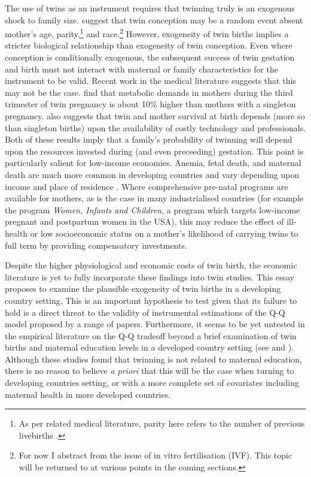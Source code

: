 \documentclass{article}[11pt,subeqn]
\begin{document}
\begin{spacing}{1.5}
The use of twins as an instrument requires that twinning truly is an exogenous shock to family size.  \citet{Kahnetal2003} suggest that twin conception may be a random event absent mother's age, 
parity,\footnote{As per related medical literature, parity here refers to the number of previous livebirths \citep{Elwood1978}.} and race.\footnote{For now I abstract from 
the issue of in vitro fertilisation (IVF).  This topic will be returned to at various points in the coming sections.} However, exogeneity of twin births implies a stricter 
biological relationship than exogeneity of twin conception.  Even where conception is conditionally exogenous, the subsequent success of twin gestation and birth must not interact with maternal or family characteristics for the instrument to be valid.  Recent work in the medical literature 
suggests that this may not be the case. \citet{Shinagawaetal2005} find that metabolic demands in mothers during the third trimester of twin pregnancy is about 10\% higher 
than mothers with a singleton pregnancy. \citet{Philipson2008}  also suggests that twin and mother survival at birth depends (more so than singleton births) upon the availability 
of costly technology and professionals.  Both of these results imply that a family's probability of twinning will depend upon the resources invested during (and even preceeding) 
gestation.  This point is particularly salient for low-income economies.  Anemia, fetal death, and maternal death are much more common in developing countries and vary depending 
upon income and place of residence \citep{Rush2000}.  Where comprehensive pre-natal programs are available for mothers, as is the case in many industrialised countries (for 
example the program \emph{Women, Infants and Children}, a program which targets low-income pregnant and postpartum women in the USA), this 
may reduce the effect of ill-health or low socioeconomic status on a mother's likelihood of carrying twins to full term by providing compensatory investments.

Despite the higher physiological and economic costs of twin birth, the economic literature is yet to fully incorporate these findings into twin studies.  This essay proposes to examine the plausible exogeneity of twin births in a developing country setting.  This is an important hypothesis to test given that its failure to
hold is a direct threat to the validity of instrumental estimations of the Q-Q model proposed by a range of papers.  Furthermore, it seems to be yet untested in the
empirical literature on the Q-Q tradeoff beyond a brief examination of twin births and maternal education levels in a developed country setting (see \citet{Blacketal2005}
and \citet{Angristetal2010}).  Although these studies found that twinning is not related to maternal education, there is no reason to believe \emph{a priori} that this
will be the case when turning to developing countries setting, or with a more complete set of covariates including maternal health in more developed countries. 


\end{spacing}
\end{document}
